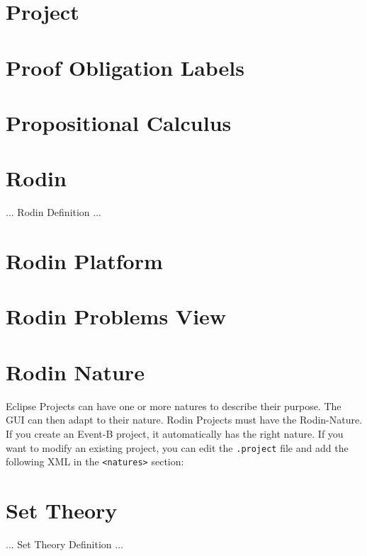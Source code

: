\section{Project}
\label{project}

\section{Proof Obligation Labels}
\label{po_labels}

\section{Propositional Calculus}
\label{propositional_calculus}

\section{Rodin}
\label{rodin}

... Rodin Definition ...


\section{Rodin Platform}
\label{rodin_platform}

\section{Rodin Problems View}
\label{rodin_problems_view}


\section{Rodin Nature}
\label{rodin_nature}

Eclipse Projects can have one or more natures to describe their purpose.  The GUI can then adapt to their nature.  Rodin Projects must have the Rodin-Nature.  If you create an Event-B project, it automatically has the right nature.  If you want to modify an existing project, you can edit the \texttt{.project} file and add the following XML in the \texttt{<natures>} section:


\section{Set Theory}
\label{set_theory}

... Set Theory Definition ...



